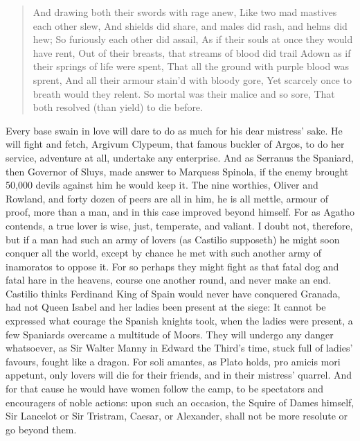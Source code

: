 \begin{verse}%
And drawing both their swords with rage anew,
Like two mad mastives each other slew,
And shields did share, and males did rash, and helms did hew;
So furiously each other did assail,
As if their souls at once they would have rent,
Out of their breasts, that streams of blood did trail
Adown as if their springs of life were spent,
That all the ground with purple blood was sprent,
And all their armour stain'd with bloody gore,
Yet scarcely once to breath would they relent.
So mortal was their malice and so sore,
That both resolved (than yield) to die before.
\end{verse}%

Every base swain in love will dare to do as much for his dear mistress'
sake. He will fight and fetch, Argivum Clypeum, that famous
buckler of Argos, to do her service, adventure at all, undertake any
enterprise. And as Serranus the Spaniard, then Governor of Sluys, made
answer to Marquess Spinola, if the enemy brought 50,000 devils against
him he would keep it. The nine worthies, Oliver and Rowland, and forty
dozen of peers are all in him, he is all mettle, armour of proof, more
than a man, and in this case improved beyond himself. For as
Agatho contends, a true lover is wise, just, temperate, and
valiant. I doubt not, therefore, but if a man had such an army of
lovers (as Castilio supposeth) he might soon conquer all the world,
except by chance he met with such another army of inamoratos to oppose
it. For so perhaps they might fight as that fatal dog and fatal
hare in the heavens, course one another round, and never make an end.
Castilio thinks Ferdinand King of Spain would never have conquered
Granada, had not Queen Isabel and her ladies been present at the siege:
It cannot be expressed what courage the Spanish knights took,
when the ladies were present, a few Spaniards overcame a multitude of
Moors. They will undergo any danger whatsoever, as Sir Walter Manny in
Edward the Third's time, stuck full of ladies' favours, fought like a
dragon. For soli amantes, as Plato holds, pro amicis mori
appetunt, only lovers will die for their friends, and in their
mistress' quarrel. And for that cause he would have women follow the
camp, to be spectators and encouragers of noble actions: upon such an
occasion, the Squire of Dames himself, Sir Lancelot or Sir
Tristram, Caesar, or Alexander, shall not be more resolute or go beyond
them.

